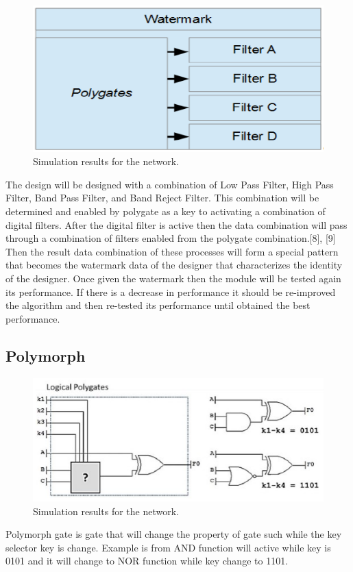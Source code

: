 \documentclass[10pt,journal,compsoc,letterpaper,final]{IEEEtran}
\begin{document}
\begin{figure}[h]
	\centering
	\includegraphics[scale=0.45]{images/box}
	\caption{Simulation results for the network.}
	\label{fig_sim}
\end{figure}

The design will be designed with a combination of Low Pass Filter, High Pass Filter, Band Pass Filter, and Band Reject Filter. This combination will be determined and enabled by polygate as a key to activating a combination of digital filters. After the digital filter is active then the data combination will pass through a combination of filters enabled from the polygate combination.[8], [9] Then the result data combination of these processes will form a special pattern that becomes the watermark data of the designer that characterizes the identity of the designer. Once given the watermark then the module will be tested again its performance. If there is a decrease in performance it should be re-improved the algorithm and then re-tested its performance until obtained the best performance.

\subsection{Polymorph}
\begin{figure}[h]
	\centering
	\includegraphics[scale=0.65]{images/polymorphgate}
	\caption{Simulation results for the network.}
	\label{fig_sim}
\end{figure}
Polymorph gate is gate that will change the property of gate such while the key selector key is change. Example is from AND function will active while key is 0101 and it will change to NOR function while key change to 1101.
\end{document}

